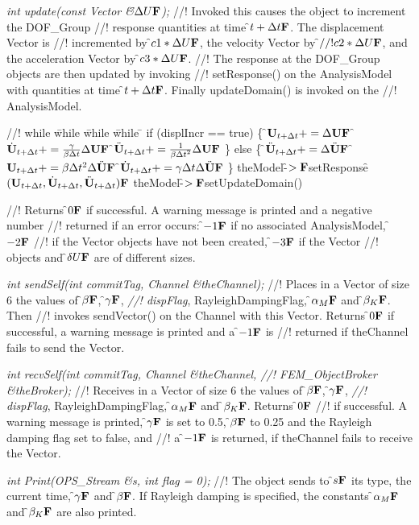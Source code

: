 {\em int update(const Vector \&\f$\Delta U{\bf F}$);}
//! Invoked this causes the object to increment the DOF\_Group
//! response quantities at time \f$t + \Delta t{\bf F}$. The displacement Vector is  
//! incremented by \f$ c1 * \Delta U{\bf F}$, the velocity Vector by \f$
//! c2 * \Delta U{\bf F}$, and the acceleration Vector by \f$c3 * \Delta U{\bf F}$.
//! The response at the DOF\_Group objects are then updated by invoking
//! setResponse() on the AnalysisModel with quantities at time \f$t +
\Delta t{\bf F}$. Finally updateDomain() is invoked on the 
//! AnalysisModel. 
\begin{tabbing}
//! while \= while \= while \= while \= \kill
\>\> if (displIncr == true) \{
\>\>\> \f$ {\bf U}_{t + \Delta t} += \Delta {\bf U}{\bf F}$
\>\>\> \f$ \dot {{\bf U}}_{t + \Delta t} += \frac{\gamma}{\beta \Delta t} \Delta {\bf U} {\bf F}$
\>\>\> \f$ \ddot {{\bf U}}_{t + \Delta t} += \frac{1}{\beta {\Delta t}^2} \Delta
{\bf U} {\bf F}$
\>\> \} else \{
\>\>\> \f$ \ddot{\bf U}_{t + \Delta t} += \Delta \ddot{\bf U}{\bf F}$
\>\>\> \f$ {\bf U}_{t + \Delta t} += \beta \Delta t^2 \Delta \ddot{\bf U} {\bf F}$
\>\>\> \f$ \dot{\bf U}_{t + \Delta t} += \gamma \Delta t \Delta \ddot{\bf U} {\bf F}$
\>\> \}
\>\> theModel-\f$>{\bf F}$setResponse\f$({\bf U}_{t + \Delta t}, \dot{\bf U}_{t+\Delta t},
\ddot{\bf U}_{t+\Delta t}){\bf F}$
\>\> theModel-\f$>{\bf F}$setUpdateDomain()
\end{tabbing}
//! Returns \f$0{\bf F}$ if successful. A warning message is printed and a negative number
//! returned if an error occurs: \f$-1{\bf F}$ if no associated AnalysisModel, \f$-2{\bf F}$
//! if the Vector objects have not been created, \f$-3{\bf F}$ if the Vector
//! objects and \f$\delta U{\bf F}$ are of different sizes.

{\em int sendSelf(int commitTag, Channel \&theChannel); } 
//! Places in a Vector of size 6 the values of \f$\beta{\bf F}$, \f$\gamma{\bf F}$, {\em
//! dispFlag}, RayleighDampingFlag, \f$\alpha_M{\bf F}$ and \f$\beta_K{\bf F}$.  Then
//! invokes sendVector() on the Channel with this Vector. Returns
\f$0{\bf F}$ if successful, a warning message is printed and a \f$-1{\bf F}$ is 
//! returned if \p theChannel fails to send the Vector. 

{\em int recvSelf(int commitTag, Channel \&theChannel, 
//! FEM\_ObjectBroker \&theBroker); } 
//! Receives in a Vector of size 6 the values of \f$\beta{\bf F}$, \f$\gamma{\bf F}$, {\em
//! dispFlag}, RayleighDampingFlag, \f$\alpha_M{\bf F}$ and \f$\beta_K{\bf F}$. Returns \f$0{\bf F}$
//! if successful. A warning message is printed, \f$\gamma{\bf F}$ is set to 0.5,
\f$\beta{\bf F}$ to 0.25 and the Rayleigh damping flag set to \p false, and
//! a \f$-1{\bf F}$ is returned, if \p theChannel fails to receive the Vector. 

{\em int Print(OPS\_Stream \&s, int flag = 0);}
//! The object sends to \f$s{\bf F}$ its type, the current time, \f$\gamma{\bf F}$ and
\f$\beta{\bf F}$. If Rayleigh damping is specified, the constants \f$\alpha_M{\bf F}$ and
\f$\beta_K{\bf F}$ are also printed.






